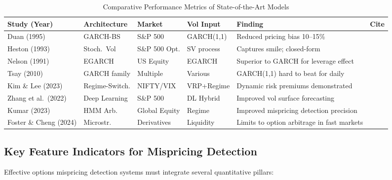 \documentclass[journal]{IEEEtran}
\begin{document}
\begin{table}[!ht]
\centering
\caption{Comparative Performance Metrics of State-of-the-Art Models}
\label{tab:model_comparison}
\small
\begin{tabularx}{\textwidth}{l l l l X l}
\toprule
\textbf{Study (Year)} & \textbf{Architecture} & \textbf{Market} &
\textbf{Vol Input} & \textbf{Finding} & \textbf{Cite} \\
\midrule
Duan (1995)           & GARCH-BS       & S\&P 500       & GARCH(1,1) &
  Reduced pricing bias 10--15\%                       & \cite{duan1995} \\
Heston (1993)         & Stoch.\ Vol    & S\&P 500 Opt.  & SV process &
  Captures smile; closed-form                         & \cite{heston1993} \\
Nelson (1991)         & EGARCH         & US Equity      & EGARCH     &
  Superior to GARCH for leverage effect               & \cite{nelson1991} \\
Tsay (2010)           & GARCH family   & Multiple       & Various    &
  GARCH(1,1) hard to beat for daily                   & \cite{tsay2010} \\
Kim \& Lee (2023)     & Regime-Switch. & NIFTY/VIX      & VRP+Regime &
  Dynamic risk premiums demonstrated                  & \cite{kim2023} \\
Zhang et al.\ (2022)  & Deep Learning  & S\&P 500       & DL Hybrid  &
  Improved vol surface forecasting                    & \cite{zhang2022} \\
Kumar (2023)          & HMM Arb.       & Global Equity  & Regime     &
  Improved mispricing detection precision             & \cite{kumar2023} \\
Foster \& Cheng (2024)& Microstr.      & Derivatives    & Liquidity  &
  Limits to option arbitrage in fast markets          & \cite{foster2024} \\
\bottomrule
\end{tabularx}
\end{table}

\subsection{Key Feature Indicators for Mispricing Detection}

Effective options mispricing detection systems must integrate several
quantitative pillars:
\end{document}
